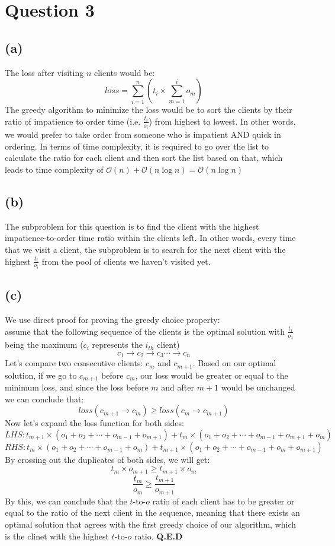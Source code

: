 
\section{Question 3}
    \subsection{(a)}
    The loss after visiting $n$ clients would be:
    \[ loss=\sum_{i=1}^{n}{(t_i \times \sum_{m=1}^{i}{o_m})} \]
    The greedy algorithm to minimize the loss would be to sort the clients by their ratio of impatience to order time
    (i.e. $\frac{t_i}{o_i}$) from highest to lowest. In other words, we would prefer to take order from someone who is
    impatient AND quick in ordering. In terms of time complexity, it is required to go over the list to calculate the
    ratio for each client and then sort the list based on that, which leads to time complexity of $\mathcal{O}(n)+
    \mathcal{O}(n\log{n})=\mathcal{O}(n\log{n})$
    \subsection{(b)}
    The subproblem for this question is to find the client with the highest impatience-to-order time ratio within the
    clients left. In other words, every time that we visit a client, the subproblem is to search for the next client
    with the highest $\frac{t_i}{o_i}$ from the pool of clients we haven't visited yet.
    \subsection{(c)}
    We use direct proof for proving the greedy choice property:
    \\ assume that the following sequence of the clients is the optimal solution with $\frac{t_1}{o_1}$ being the maximum
    ($c_i$ represents the $i_{th}$ client)
    \[ c_1 \rightarrow c_2 \rightarrow c_3 \cdots \rightarrow c_n \] 
    Let's compare two consecutive clients: $c_m$ and $c_{m+1}$. Based on our optimal solution, if we go to $c_{m+1}$ before
    $c_m$, our loss would be greater or equal to the minimum loss, and since the loss before $m$ and after $m+1$ would be unchanged
    we can conclude that:
    \[ loss(c_{m+1} \rightarrow c_m) \geq loss(c_m \rightarrow c_{m+1}) \] 
    Now let's expand the loss function for both sides:
    \[ LHS: t_{m+1}\times(o_1+o_2+\cdots+o_{m-1}+o_{m+1})+t_{m}\times(o_1+o_2+\cdots+o_{m-1}+o_{m+1}+o_m) \]
    \[ RHS: t_{m}\times(o_1+o_2+\cdots+o_{m-1}+o_{m})+t_{m+1}\times(o_1+o_2+\cdots+o_{m-1}+o_{m}+o_{m+1}) \]
    By crossing out the duplicates of both sides, we will get:
    \[ t_{m} \times o_{m+1} \geq t_{m+1} \times o_{m} \]
    \[ \frac{t_m}{o_m} \geq \frac{t_{m+1}}{o_{m+1}} \]
    By this, we can conclude that the $t$-to-$o$ ratio of each client has to be greater or equal to the ratio of the next client in the
    sequence, meaning that there exists an optimal solution that agrees with the first greedy choice of our algorithm, which is the clinet with
    the highest $t$-to-$o$ ratio. \textbf{Q.E.D}
